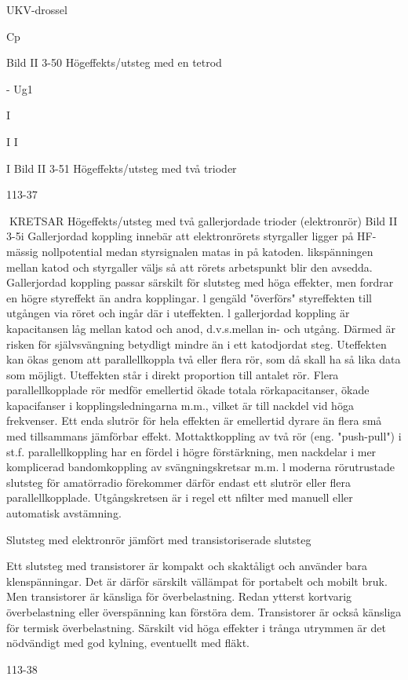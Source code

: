 {{UKV-drossel

Cp

Bild II 3-50 Högeffekts/utsteg med en tetrod

- Ug1

I

I I

I
Bild II 3-51 Högeffekts/utsteg med två trioder

113-37

KRETSAR
Högeffekts/utsteg med två gallerjordade trioder (elektronrör)
Bild II 3-5i
Gallerjordad koppling innebär att elektronrörets styrgaller ligger på HF-mässig nollpotential medan styrsignalen matas in på
katoden. likspänningen mellan katod och
styrgaller väljs så att rörets arbetspunkt blir
den avsedda.
Gallerjordad koppling passar särskilt för
slutsteg med höga effekter, men fordrar en
högre styreffekt än andra kopplingar. l gengäld "överförs" styreffekten till utgången via
röret och ingår där i uteffekten. l gallerjordad
koppling är kapacitansen låg mellan katod
och anod, d.v.s.mellan in- och utgång. Därmed är risken för självsvängning betydligt
mindre än i ett katodjordat steg.
Uteffekten kan ökas genom att parallellkoppla två eller flera rör, som då skall ha så
lika data som möjligt. Uteffekten står i direkt
proportion till antalet rör.
Flera parallellkopplade rör medför emellertid ökade totala rörkapacitanser, ökade
kapacifanser i kopplingsledningarna m.m.,
vilket är till nackdel vid höga frekvenser.
Ett enda slutrör för hela effekten är emellertid dyrare än flera små med tillsammans
jämförbar effekt. Mottaktkoppling av två rör
(eng. "push-pull") i st.f. parallellkoppling har
en fördel i högre förstärkning, men nackdelar i mer komplicerad bandomkoppling av
svängningskretsar m.m. l moderna rörutrustade slutsteg för amatörradio förekommer
därför endast ett slutrör eller flera parallellkopplade. Utgångskretsen är i regel ett nfilter med manuell eller automatisk avstämning.

Slutsteg med elektronrör jämfört med
transistoriserade slutsteg

Ett slutsteg med transistorer är kompakt och
skaktåligt och använder bara klenspänningar. Det är därför särskilt vällämpat för portabelt och mobilt bruk.
Men transistorer är känsliga för överbelastning. Redan ytterst kortvarig överbelastning eller överspänning kan förstöra dem.
Transistorer är också känsliga för termisk
överbelastning. Särskilt vid höga effekter i
trånga utrymmen är det nödvändigt med god
kylning, eventuellt med fläkt.

113-38

}}
